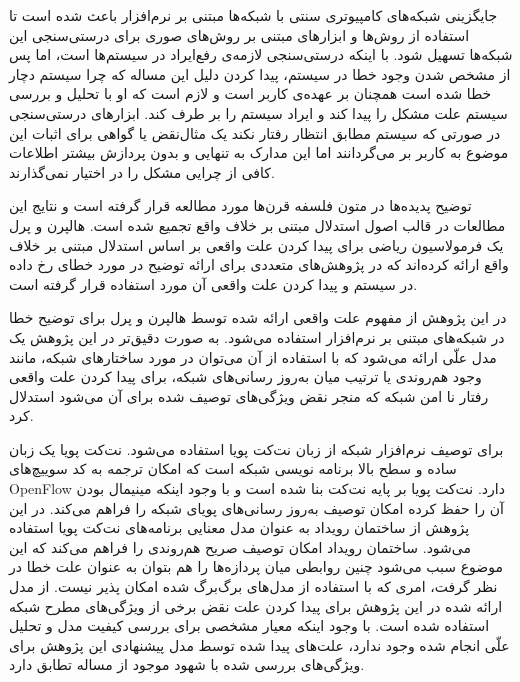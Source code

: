 جایگزینی شبکه‌های کامپیوتری سنتی با شبکه‌ها مبتنی بر نرم‌افزار باعث شده است تا استفاده از روش‌ها و ابزار‌های مبتنی بر روش‌های صوری برای درستی‌سنجی این شبکه‌ها تسهیل شود.
با اینکه درستی‌سنجی لازمه‌ی رفع‌ایراد در سیستم‌ها است، اما پس از مشخص شدن وجود خطا در سیستم، پیدا کردن دلیل این مساله که چرا سیستم دچار خطا شده است همچنان بر عهده‌ی کاربر است و لازم است که او با تحلیل و بررسی سیستم علت مشکل را پیدا کند و ایراد سیستم را بر طرف کند.
ابزار‌های درستی‌سنجی در صورتی که سیستم مطابق انتظار رفتار نکند یک مثال‌نقض یا گواهی برای اثبات این موضوع به کاربر بر می‌گردانند اما این مدارک به تنهایی و بدون پردازش بیشتر اطلاعات کافی از چرایی مشکل را در اختیار نمی‌گذارند.

توضیح پدیده‌ها در متون فلسفه قرن‌ها مورد مطالعه قرار گرفته است و نتایج این مطالعات در قالب اصول استدلال مبتنی بر خلاف واقع تجمیع شده است.
هالپرن و پرل یک فرمولاسیون ریاضی برای پیدا کردن علت واقعی بر اساس استدلال مبتنی بر خلاف واقع ارائه کرده‌اند که در پژوهش‌های متعددی برای ارائه توضیح در مورد خطای رخ داده در سیستم و پیدا کردن علت واقعی آن مورد استفاده قرار گرفته است.

در این پژوهش از مفهوم علت واقعی ارائه شده توسط هالپرن و پرل برای توضیح خطا در شبکه‌های مبتنی بر نرم‌افزار استفاده می‌شود.
به صورت دقیق‌تر در این پژوهش یک مدل علّی ارائه می‌شود که با استفاده از آن می‌توان در مورد ساختارهای شبکه، مانند وجود هم‌روندی یا ترتیب میان به‌روز رسانی‌های شبکه، برای پیدا کردن علت واقعی رفتار نا امن شبکه که منجر نقض ویژگی‌های توصیف شده برای آن می‌شود استدلال کرد.

برای توصیف نرم‌افزار شبکه از زبان نت‌کت‌ پویا استفاده می‌شود.
نت‌کت پویا یک زبان ساده و سطح‌ بالا برنامه‌ نویسی شبکه است که امکان ترجمه به کد سوییچ‌های 
OpenFlow
دارد.
نت‌کت پویا بر پایه نت‌کت بنا شده است و با وجود اینکه مینیمال بودن آن را حفظ کرده امکان توصیف به‌روز رسانی‌های پویای شبکه را فراهم می‌کند.
در این پژوهش از ساختمان رویداد به عنوان مدل معنایی برنامه‌های نت‌کت پویا استفاده می‌شود.
ساختمان رویداد امکان توصیف صریح هم‌روندی را فراهم می‌کند که این موضوع سبب می‌شود چنین روابطی میان پردازه‌ها را هم بتوان به عنوان علت خطا در نظر گرفت، امری که با استفاده از مدل‌های برگ‌برگ شده امکان پذیر نیست.
از مدل ارائه شده در این پژوهش برای پیدا کردن علت نقض برخی از ویژگی‌های مطرح شبکه استفاده شده است.
با وجود اینکه معیار مشخصی برای بررسی کیفیت مدل و تحلیل علّی انجام شده وجود ندارد، علت‌های پیدا شده توسط مدل پیشنهادی این پژوهش برای ویژگی‌های بررسی شده با شهود موجود از مساله تطابق دارد.
